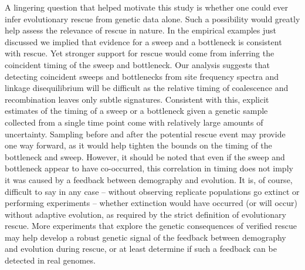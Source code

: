 \documentclass[]{article}
\begin{document}
A lingering question that helped motivate this study is whether one could ever infer evolutionary rescue from genetic data alone.
Such a possibility would greatly help assess the relevance of rescue in nature.
In the empirical examples just discussed we implied that evidence for a sweep and a bottleneck is consistent with rescue.
Yet stronger support for rescue would come from inferring the coincident timing of the sweep and bottleneck.
Our analysis suggests that detecting coincident sweeps and bottlenecks from site frequency spectra and linkage disequilibrium will be difficult as the relative timing of coalescence and recombination leaves only subtle signatures.
Consistent with this, explicit estimates of the timing of a sweep \citep[e.g.,][]{ormond2016inferring} or a bottleneck \citep[reviewed in][]{beichman2018using} given a genetic sample collected from a single time point come with relatively large amounts of uncertainty.
Sampling before and after the potential rescue event may provide one way forward, as it would help tighten the bounds on the timing of the bottleneck and sweep.
However, it should be noted that even if the sweep and bottleneck appear to have co-occurred, this correlation in timing does not imply it was caused by a feedback between demography and evolution. 
It is, of course, difficult to say in any case -- without observing replicate populations go extinct or performing experiments -- whether extinction would have occurred (or will occur) without adaptive evolution, as required by the strict definition of evolutionary rescue.
More experiments \citep[such as][]{rego2019dynamics} that explore the genetic consequences of verified rescue may help develop a robust genetic signal of the feedback between demography and evolution during rescue, or at least determine if such a feedback can be detected in real genomes.
\end{document}
